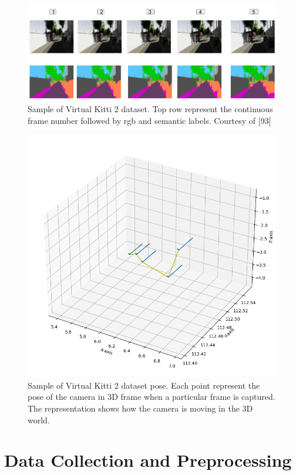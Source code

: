 	\begin{figure}
		\centering
		\includegraphics[width=14cm]{images/images_segm_vkitti.png}
		\caption{Sample of Virtual Kitti 2 dataset. Top row represent the continuous frame number followed by rgb and semantic labels. Courtesy of [93]}
		\label{fig:sample_scannet_vkitti_2}
	\end{figure}

	\begin{figure}
		\centering
		\includegraphics[width=14cm]{images/pose_viz_vkitti.png}
		\caption{Sample of Virtual Kitti 2 dataset pose. Each point represent the pose of the camera in 3D frame when a particular frame is captured. The representation shows how the camera is moving in the 3D world.}
		\label{fig:sample_pose_scannet_vkitti_2}
	\end{figure}
	
	\section{Data Collection and Preprocessing}
	
